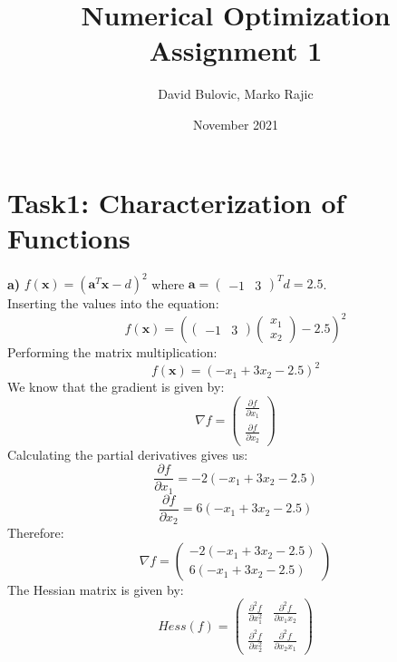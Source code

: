 \documentclass{article}
\title{Numerical Optimization Assignment 1}
\author{David Bulovic, Marko Rajic}
\date{November 2021}
\begin{document}
\maketitle

\section{Task1: Characterization of Functions}
\textbf{a)} $f(\boldsymbol{x}) = (\boldsymbol{a}^T \boldsymbol{x} - d)^2$ where $\boldsymbol{a} = \begin{pmatrix}-1 & 3\end{pmatrix}^T d = 2.5$.\\
Inserting the values into the equation:
\begin{equation*}
    f(\boldsymbol{x}) = (\begin{pmatrix}-1 & 3\end{pmatrix} \begin{pmatrix} x_1 \\ x_2 \end{pmatrix} - 2.5)^2
\end{equation*}
Performing the matrix multiplication:
\begin{equation*}
    f(\boldsymbol{x}) = (-x_1 + 3x_2 - 2.5)^2
\end{equation*}
We know that the gradient is given by:
\begin{equation*}
    \nabla f = \begin{pmatrix} \frac{\partial f}{\partial x_1}\\ \frac{\partial f}{\partial x_2}\end{pmatrix}
\end{equation*}
Calculating the partial derivatives gives us:
\begin{equation*}
    \frac{\partial f}{\partial x_1} = -2(-x_1 + 3x_2 -2.5)
\end{equation*}
\begin{equation*}
    \frac{\partial f}{\partial x_2} = 6(-x_1 + 3x_2 -2.5)
\end{equation*}
Therefore:
\begin{equation*}
    \nabla f = \begin{pmatrix} -2(-x_1 + 3x_2 -2.5)\\ 6(-x_1 + 3x_2 -2.5)\end{pmatrix}
\end{equation*}
The Hessian matrix is given by:
\begin{equation*}
    Hess(f) = \begin{pmatrix} \frac{\partial ^2 f}{\partial x_1^2} & \frac{\partial ^2 f}{\partial x_1x_2}\\ \frac{\partial ^2 f}{\partial x_2^2} & \frac{\partial ^2 f}{\partial x_2x_1}\end{pmatrix}
\end{equation*}
\end{document}
